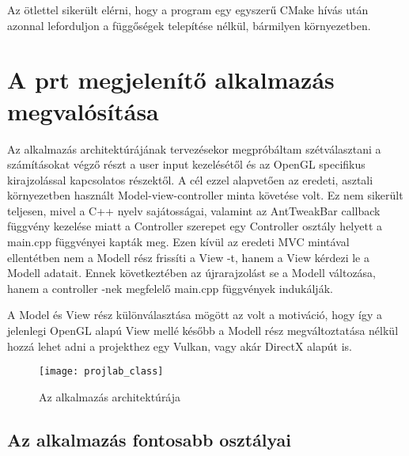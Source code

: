 Az ötlettel sikerült elérni, 
hogy a program egy egyszerű CMake hívás után azonnal 
leforduljon a függőségek telepítése nélkül, 
bármilyen környezetben.

\section{A prt megjelenítő alkalmazás megvalósítása}

Az alkalmazás architektúrájának tervezésekor megpróbáltam 
szétválasztani a számításokat végző részt 
a user input kezelésétől és 
az OpenGL specifikus kirajzolással kapcsolatos részektől. 
A cél ezzel alapvetően az eredeti, 
asztali környezetben használt Model-view-controller 
minta követése volt. 
Ez nem sikerült teljesen,
mivel a C++ nyelv sajátosságai, 
valamint az AntTweakBar callback függvény kezelése miatt 
a Controller szerepet egy Controller osztály helyett 
a {\ttfamily main.cpp} függvényei kapták meg. 
Ezen kívül az eredeti MVC mintával ellentétben nem 
a Modell rész frissíti a View -t, 
hanem a View kérdezi le a Modell adatait. 
Ennek következtében az újrarajzolást se a Modell változása, 
hanem a controller -nek megfelelő {\ttfamily main.cpp} függvények indukálják.

A Model és View rész különválasztása mögött az volt a motiváció, 
hogy így a jelenlegi OpenGL alapú View mellé 
később a Modell rész megváltoztatása nélkül 
hozzá lehet adni a projekthez egy Vulkan, 
vagy akár DirectX alapút is. 

\begin{figure}[!htb]
\centering
\texttt{[image: projlab\_class]}
\caption{Az alkalmazás architektúrája}
\label{fig:x projlabClass}
\end{figure}

\subsection{Az alkalmazás fontosabb osztályai}


